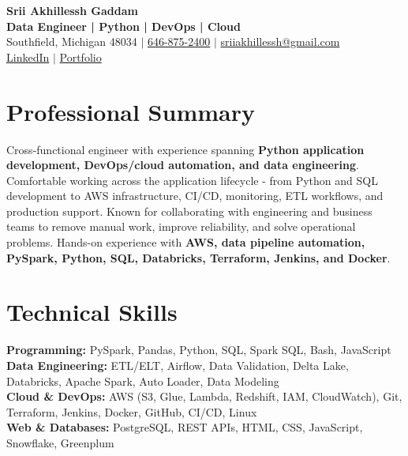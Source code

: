 \documentclass[letterpaper,10pt]{article}
\begin{document}
\fontsize{9.35pt}{10.45pt}\selectfont

\begin{center}
    {\LARGE \textbf{Srii Akhillessh Gaddam}} \\[-1pt]
    \textbf{Data Engineer | Python | DevOps | Cloud} \\[2pt]
    Southfield, Michigan 48034 $|$
    \href{tel:6468752400}{646-875-2400} $|$
    \href{mailto:sriiakhillessh@gmail.com}{sriiakhillessh@gmail.com} \\[1pt]
    \href{https://www.linkedin.com/in/srii-akhiilessh-gaddam-b48668191/}{LinkedIn} $|$
    \href{https://sriiakhillesshg.github.io/portfolio/}{Portfolio}
\end{center}
\vspace{-8pt}

\section{Professional Summary}
\small{Cross-functional engineer with experience spanning \textbf{Python application development, DevOps/cloud automation, and data engineering}. Comfortable working across the application lifecycle - from Python and SQL development to AWS infrastructure, CI/CD, monitoring, ETL workflows, and production support. Known for collaborating with engineering and business teams to remove manual work, improve reliability, and solve operational problems. Hands-on experience with \textbf{AWS, data pipeline automation, PySpark, Python, SQL, Databricks, Terraform, Jenkins, and Docker}.}

\section{Technical Skills}
\small{
\textbf{Programming:} PySpark, Pandas, Python, SQL, Spark SQL, Bash, JavaScript \\
\textbf{Data Engineering:} ETL/ELT, Airflow, Data Validation, Delta Lake, Databricks, Apache Spark, Auto Loader, Data Modeling \\
\textbf{Cloud \& DevOps:} AWS (S3, Glue, Lambda, Redshift, IAM, CloudWatch), Git, Terraform, Jenkins, Docker, GitHub, CI/CD, Linux \\
\textbf{Web \& Databases:} PostgreSQL, REST APIs, HTML, CSS, JavaScript, Snowflake, Greenplum
}

\end{document}
